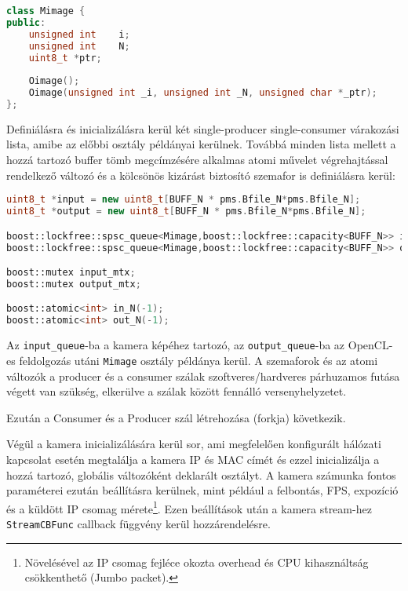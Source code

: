 \begin{lstlisting}[language=C++]
class Mimage {
public:
	unsigned int	i;
	unsigned int	N;
	uint8_t	*ptr;
	
	Oimage();
	Oimage(unsigned int _i, unsigned int _N, unsigned char *_ptr);
};
\end{lstlisting}

\noindent Definiálásra és inicializálásra kerül két single-producer single-consumer várakozási lista, amibe az előbbi osztály
példányai kerülnek. Továbbá minden lista mellett a hozzá tartozó buffer tömb megcímzésére alkalmas atomi művelet végrehajtással
rendelkező változó és a kölcsönös kizárást biztosító szemafor is definiálásra kerül:

\begin{lstlisting}[language=C++]
uint8_t *input = new uint8_t[BUFF_N * pms.Bfile_N*pms.Bfile_N];
uint8_t *output = new uint8_t[BUFF_N * pms.Bfile_N*pms.Bfile_N];

boost::lockfree::spsc_queue<Mimage,boost::lockfree::capacity<BUFF_N>> input_queue;
boost::lockfree::spsc_queue<Mimage,boost::lockfree::capacity<BUFF_N>> output_queue;

boost::mutex input_mtx;
boost::mutex output_mtx;

boost::atomic<int> in_N(-1);
boost::atomic<int> out_N(-1);
\end{lstlisting}

\noindent Az \texttt{input\_queue}-ba a kamera képéhez tartozó, az \texttt{output\_queue}-ba az OpenCL-es feldolgozás utáni
	\texttt{Mimage} osztály példánya kerül. A szemaforok és az atomi változók a producer és a consumer szálak szoftveres/hardveres
	párhuzamos futása végett van szükség, elkerülve a szálak között fennálló versenyhelyzetet.

	Ezután a Consumer és a Producer szál létrehozása (forkja) következik.
	
	Végül a kamera inicializálására kerül sor, ami megfelelően konfigurált hálózati kapcsolat esetén megtalálja a kamera IP és MAC
	címét és ezzel inicializálja a hozzá tartozó, globális változóként deklarált osztályt. A kamera számunka fontos paraméterei ezután
	beállításra kerülnek, mint például a felbontás, FPS, expozíció és a küldött IP csomag mérete\footnote{Növelésével az IP csomag
	fejléce okozta overhead és CPU kihasználtság csökkenthető (Jumbo packet).}.
	Ezen beállítások után a kamera stream-hez \texttt{StreamCBFunc} callback függvény kerül hozzárendelésre. 
	 
